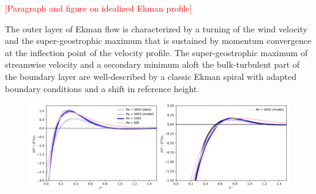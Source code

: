 \documentclass[a4paper,11pt]{amsart}
\newcommand{\todo}[1]{\textcolor{red}{$[$#1$]$}}
\begin{document}
%
\todo{Paragraph and figure on idealized Ekman profile}
%
\par 
% 
The outer layer of Ekman flow is characterized by a turning of the wind velocity and the super-geostrophic maximum
that is sustained by momentum convergence at the inflection point of the velocity profile.
%
The super-geostrophic maximum of streamwise velocity and a secondary minimum aloft the bulk-turbulent part of
the boundary layer are well-described by a classic Ekman spiral with adapted boundary conditions and a shift
in reference height.
%
\begin{figure}
  \includegraphics[width=0.5\textwidth]{../plot/outer_layer_u.pdf}\includegraphics[width=0.5\textwidth]{../plot/outer_layer_w.pdf}
  \caption{
    \label{fig:profiles_outer} 
  }
\end{figure}
\end{document}
